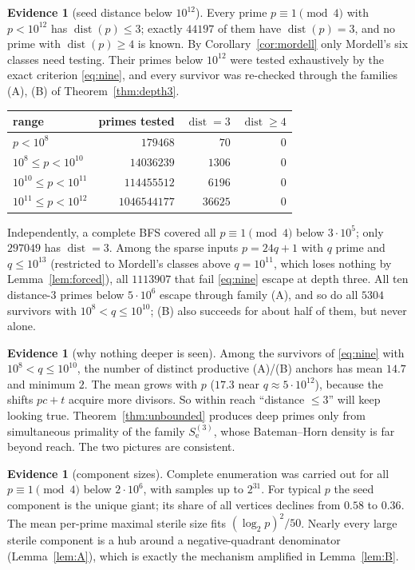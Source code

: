 \documentclass[11pt,reqno]{amsart}
\theoremstyle{definition}
\newtheorem{evidence}[theorem]{Evidence}
\newcommand{\Se}{S_{\mathrm e}}
\newcommand{\dist}{\operatorname{dist}}
\begin{document}
\begin{evidence}[seed distance below $10^{12}$]\label{ev:survey}
Every prime $p\equiv1\pmod4$ with $p<10^{12}$ has $\dist(p)\le3$; exactly
$44197$ of them have $\dist(p)=3$, and no prime with $\dist(p)\ge4$ is
known.  By Corollary~\ref{cor:mordell} only Mordell's six classes need
testing.  Their primes below $10^{12}$ were tested exhaustively by the
exact criterion \eqref{eq:nine}, and every survivor was re-checked through
the families (A), (B) of Theorem~\ref{thm:depth3}.
\begin{center}
\begin{tabular}{lrrr}
\toprule
range & primes tested & $\dist=3$ & $\dist\ge4$\\\midrule
$p<10^8$ & $179468$ & $70$ & $0$\\
$10^8\le p<10^{10}$ & $14036239$ & $1306$ & $0$\\
$10^{10}\le p<10^{11}$ & $114455512$ & $6196$ & $0$\\
$10^{11}\le p<10^{12}$ & $1046544177$ & $36625$ & $0$\\\bottomrule
\end{tabular}
\end{center}
Independently, a complete BFS covered all $p\equiv1\pmod4$ below
$3\cdot10^5$; only $297049$ has $\dist=3$.  Among the sparse inputs
$p=24q+1$ with $q$ prime and $q\le10^{13}$ (restricted to Mordell's
classes above $q=10^{11}$, which loses nothing by Lemma~\ref{lem:forced}),
all $1113907$ that fail \eqref{eq:nine} escape at depth three.  All ten
distance-$3$ primes below $5\cdot10^6$ escape through family (A), and so
do all $5304$ survivors with $10^8<q\le10^{10}$; (B) also succeeds for about
half of them, but never alone.
\end{evidence}

\begin{evidence}[why nothing deeper is seen]\label{ev:anchors}
Among the survivors of \eqref{eq:nine} with $10^8<q\le10^{10}$, the
number of distinct productive (A)/(B) anchors has mean $14.7$ and minimum
$2$.  The mean grows with $p$ ($17.3$ near $q\approx5\cdot10^{12}$),
because the shifts $pc+t$ acquire more divisors.  So within reach
``distance $\le3$'' will keep looking true.  Theorem~\ref{thm:unbounded}
produces deep primes only from simultaneous primality of the family
$\Se^{(3)}$, whose Bateman--Horn density is far beyond reach.  The two
pictures are consistent.
\end{evidence}

\begin{evidence}[component sizes]\label{ev:sizes}
Complete enumeration was carried out for all $p\equiv1\pmod4$ below
$2\cdot10^6$, with samples up to $2^{31}$.  For typical $p$ the seed
component is the unique giant; its share of all vertices declines from
$0.58$ to $0.36$.  The mean per-prime maximal sterile size fits
$(\log_2p)^2/50$.  Nearly every large sterile component is a hub around a
negative-quadrant denominator (Lemma~\ref{lem:A}), which is exactly the
mechanism amplified in Lemma~\ref{lem:B}.
\end{evidence}
\end{document}
